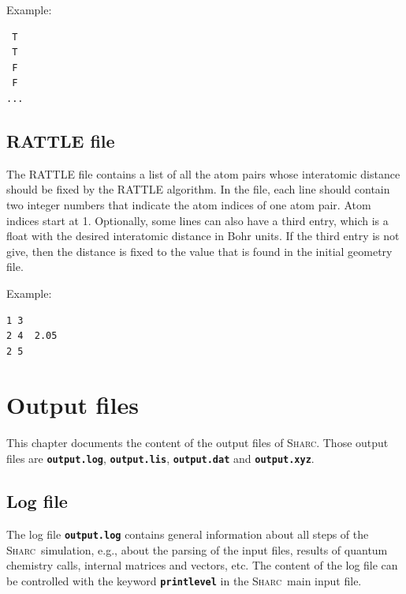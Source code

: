 \documentclass[a4paper,10pt,DIV=15,openany]{scrbook}
\newcommand{\sharc}{\textsc{Sharc}}
\newcommand{\ttt}[1]{\textbf{\texttt{#1}}}
\newenvironment{example}{
  \setlength{\OuterFrameSep}{3pt}
  \vspace{0mm}
  \definecolor{shadecolor}{HTML}{E4F4FF}
  \begin{shaded}
}{
  \end{shaded}
}
\begin{document}
Example:
\begin{example}
\begin{verbatim}
 T
 T
 F
 F
...
\end{verbatim}
\end{example}

\section{RATTLE file}\label{sec:rattlefile}

The RATTLE file contains a list of all the atom pairs whose interatomic distance should be fixed by the RATTLE algorithm.
In the file, each line should contain two integer numbers that indicate the atom indices of one atom pair.
Atom indices start at 1.
Optionally, some lines can also have a third entry, which is a float with the desired interatomic distance in Bohr units.
If the third entry is not give, then the distance is fixed to the value that is found in the initial geometry file.

Example:
\begin{example}
\begin{verbatim}
1 3
2 4  2.05
2 5
\end{verbatim}
\end{example}




\chapter{Output files}\label{chap:output}

This chapter documents the content of the output files of \sharc. Those output files are \ttt{output.log}, \ttt{output.lis}, \ttt{output.dat} and \ttt{output.xyz}.

\section{Log file}\label{sec:logfile}

The log file \ttt{output.log} contains general information about all steps of the \sharc\ simulation, e.g., about the parsing of the input files, results of quantum chemistry calls, internal matrices and vectors, etc. The content of the log file can be controlled with the keyword \ttt{printlevel} in the \sharc\ main input file.
\end{document}
